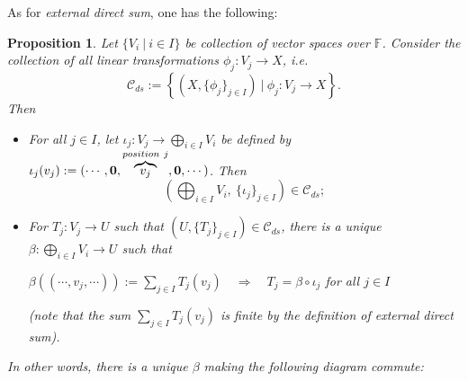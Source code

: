 \documentclass[12pt]{amsbook}
\newtheorem{proposition}[theorem]{Proposition}
\begin{document}
As for {\it external direct sum}, one has the following:
\begin{proposition}
    Let $\{V_i\ |\ i \in I\}$ be collection of vector spaces over $\mathbb{F}$. Consider the collection of all linear transformations $\phi_j: V_j \to X$, i.e.
    $$\mathcal{C}_{ds} := \left\{(X, \{\phi_j\}_{j \in I})\ |\ \phi_j : V_j \to X \right\}.$$
    Then
    \begin{itemize}
        \item[(a)] For all $j \in I$, let $\iota_j: V_j \to \bigoplus_{i \in I} V_i$ be defined by $\iota_j(v_j) := (\cdots, {\bf 0}, \overbrace{v_j}^{position\ j}, {\bf 0}, \cdots)$. Then
        $$\left(\bigoplus_{i \in I} V_i,\ \{\iota_j\}_{j \in I} \right) \in \mathcal{C}_{ds};$$
        \item[(b)] For $T_j: V_j \to U$ such that $(U, \{T_j\}_{j \in I}) \in \mathcal{C}_{ds}$, there is a unique $\beta: \bigoplus_{i \in I} V_i \to U$ such that 
        \begin{center}
        $\beta((\cdots, v_j, \cdots)) := \sum_{j \in I} T_j(v_j) \quad \Rightarrow \quad T_j = \beta \circ \iota_j$ for all $j \in I$
        \end{center}
        (note that the sum $\sum_{j \in I} T_j(v_j)$ is finite by the definition of external direct sum).
    \end{itemize}
In other words, there is a unique $\beta$ making the following diagram commute:
\begin{center}
\end{center}
\end{proposition}
\end{document}
